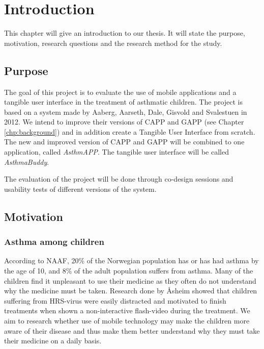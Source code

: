 \chapter{Introduction}
\label{chp:introduction}

This chapter will give an introduction to our thesis. It will state the purpose, motivation, research questions and the research method for the study. 

\section{Purpose}
\label{sec:purpose}
The goal of this project is to evaluate the use of mobile applications and a tangible user interface in the treatment of asthmatic children. The project is based on a system made by Aaberg, Aarseth, Dale, Gisvold and Svalestuen in 2012\cite{CustomerDriven}. We intend to improve their versions of CAPP and GAPP (see Chapter \ref{chp:background}) and in addition create a Tangible User Interface from scratch. The new and improved version of CAPP and GAPP will be combined to one application, called \emph{AsthmAPP}. The tangible user interface will be called \emph{AsthmaBuddy}.

The evaluation of the project will be done through co-design sessions and usability tests of different versions of the system. 
 



\section{Motivation}
\label{sec:motivation}

\subsection{Asthma among children}
According to NAAF, 20\% of the Norwegian population has or has had asthma by the age of 10, and 8\% of the adult population suffers from asthma\cite{NAAF}. Many of the children find it unpleasant to use their medicine as they often do not understand why the medicine must be taken. Research done by \r{A}sheim showed that children suffering from HRS-virus were easily distracted and motivated to finish treatments when shown a non-interactive flash-video during the treatment\cite{Asheim610877}. We aim to research whether use of mobile technology may make the children more aware of their disease and thus make them better understand why they must take their medicine on a daily basis. 


